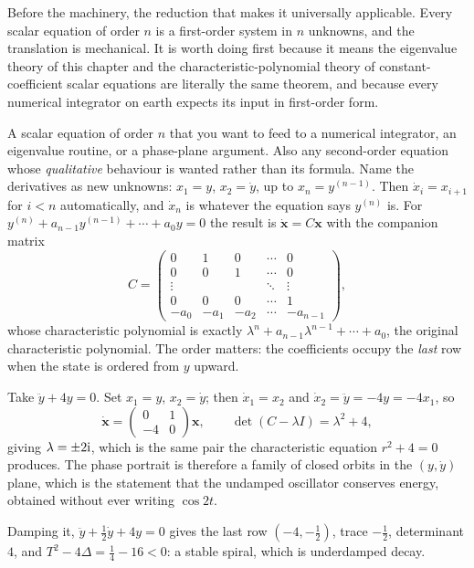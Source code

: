 Before the machinery, the reduction that makes it universally applicable. Every scalar equation of order $n$ is a first-order system in $n$ unknowns, and the translation is mechanical. It is worth doing first because it means the eigenvalue theory of this chapter and the characteristic-polynomial theory of constant-coefficient scalar equations are literally the same theorem, and because every numerical integrator on earth expects its input in first-order form.

\cue A scalar equation of order $n$ that you want to feed to a numerical integrator, an eigenvalue routine, or a phase-plane argument. Also any second-order equation whose \emph{qualitative} behaviour is wanted rather than its formula.
\method Name the derivatives as new unknowns: $x_1=y$, $x_2=\dot y$, up to $x_n=y^{(n-1)}$. Then $\dot x_i=x_{i+1}$ for $i<n$ automatically, and $\dot x_n$ is whatever the equation says $y^{(n)}$ is. For $y^{(n)}+a_{n-1}y^{(n-1)}+\cdots+a_0y=0$ the result is $\dot{\mathbf{x}}=C\mathbf{x}$ with the companion matrix
\[C=\begin{pmatrix}0&1&0&\cdots&0\\0&0&1&\cdots&0\\ \vdots&&&\ddots&\vdots\\ 0&0&0&\cdots&1\\ -a_0&-a_1&-a_2&\cdots&-a_{n-1}\end{pmatrix},\]
whose characteristic polynomial is exactly $\lambda^{n}+a_{n-1}\lambda^{n-1}+\cdots+a_0$, the original characteristic polynomial. The order matters: the coefficients occupy the \emph{last} row when the state is ordered from $y$ upward.

\begin{worked}
Take $\ddot y+4y=0$. Set $x_1=y$, $x_2=\dot y$; then $\dot x_1=x_2$ and $\dot x_2=\ddot y=-4y=-4x_1$, so
\[\dot{\mathbf{x}}=\begin{pmatrix}0&1\\-4&0\end{pmatrix}\mathbf{x},\qquad \det(C-\lambda I)=\lambda^{2}+4,\]
giving $\lambda=\pm2\mathrm{i}$, which is the same pair the characteristic equation $r^{2}+4=0$ produces. The phase portrait is therefore a family of closed orbits in the $(y,\dot y)$ plane, which is the statement that the undamped oscillator conserves energy, obtained without ever writing $\cos2t$.

Damping it, $\ddot y+\tfrac12\dot y+4y=0$ gives the last row $(-4,-\tfrac12)$, trace $-\tfrac12$, determinant $4$, and $T^{2}-4\Delta=\tfrac14-16<0$: a stable spiral, which is underdamped decay.
\end{worked}

